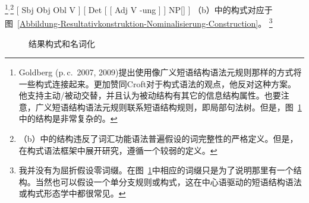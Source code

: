 \footnote{
  Goldberg (p.\,c.\ 2007, 2009)提出使用像广义短语结构语法元规则那样的方式将一些构式连接起来。\citet[]{Deppermann2006a}更加赞同Croft对于构式语法的观点，他反对这种方案。他支持主动/被动交替，并且认为被动结构有其它的信息结构属性。也要注意，广义短语结构语法元规则联系短语结构规则，即局部句法树。但是，图~\ref{Abbildung-Resultativkonstruktion-Nominalisierung-Construction}中的结构是非常复杂的。
}$^,$\footnote{
（b）中的结构违反了词汇功能语法\indexlfgc 普遍假设的词完整性的严格定义。但是，\citet{Booij2005a,Booij2009a}在构式语法\indexcxgc 框架中展开研究，遵循一个较弱的定义。
}
\eal
\ex {}[ Sbj Obj Obl V ]
\ex {}[ Det [ [ Adj V -ung ] ] NP[] ]
\zl
\addlines
（b）中的构式对应于图~\vref{Abbildung-Resultativkonstruktion-Nominalisierung-Construction}。
\footnote{
  我并没有为屈折假设零词缀。在图~\ref{Abbildung-Resultativkonstruktion-Nominalisierung-Construction}中相应的词缀只是为了说明那里有一个结构。当然也可以假设一个单分支规则或构式，这在中心语驱动的短语结构语法或构式形态学中都很常见。
}
\begin{figure}
\centering
{}
\caption{\label{Abbildung-Resultativkonstruktion-Nominalisierung-Construction}结果构式和名词化}
\end{figure}%
